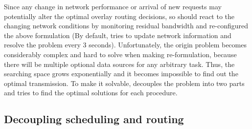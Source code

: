Since any change in network performance or arrival of
new requests may potentially alter the optimal overlay
routing decisions,
so \name should react to the changing network conditions by monitoring residual bandwidth and re-configured the above formulation (By default, \name tries to update network information and resolve the problem every 3 seconds).  Unfortunately, the origin problem becomes considerably complex and hard to solve when making re-formulation, because there will be multiple optional data sources for any arbitrary task. Thus, the searching space grows exponentially and it becomes impossible to find out the optimal transmission. To make it solvable, \name decouples the problem into two parts and tries to find the optimal solutions for each procedure.


\subsection{Decoupling scheduling and routing}
\label{subsec:logic:separation}


